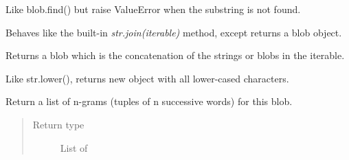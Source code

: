 \documentclass[letterpaper,10pt,english]{sphinxmanual}
\begin{document}
\begin{fulllineitems}
\begin{fulllineitems}
\end{fulllineitems}


\begin{fulllineitems}
\label{api_reference:textblob_de.blob.BaseBlob.index}
Like blob.find() but raise ValueError when the substring
is not found.

\end{fulllineitems}


\begin{fulllineitems}
\label{api_reference:textblob_de.blob.BaseBlob.join}
Behaves like the built-in \emph{str.join(iterable)} method, except
returns a blob object.

Returns a blob which is the concatenation of the strings or blobs
in the iterable.

\end{fulllineitems}


\begin{fulllineitems}
\label{api_reference:textblob_de.blob.BaseBlob.lower}
Like str.lower(), returns new object with all lower-cased characters.

\end{fulllineitems}


\begin{fulllineitems}
\label{api_reference:textblob_de.blob.BaseBlob.ngrams}
Return a list of n-grams (tuples of n successive words) for this
blob.
\begin{quote}\begin{description}
\item[{Return type}] \leavevmode
List of {\hyperref[api_reference:textblob_de.blob.WordList]{}}

\end{description}\end{quote}

\end{fulllineitems}


\end{fulllineitems}
\end{document}
